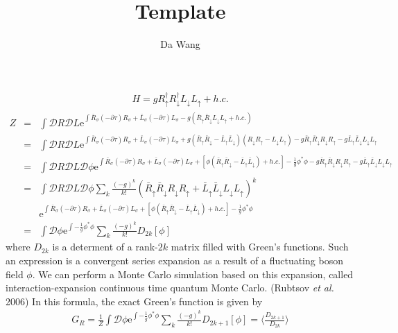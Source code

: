 \documentclass[11pt]{article}
\newcommand{\bea}{\begin{eqnarray}}
\newcommand{\eea}{\end{eqnarray}}
\newcommand{\me}{\mathrm{e}}
\begin{document}
\title{Template}
\author{Da Wang}%
\maketitle



\bea H=gR_\uparrow^\dag R_\downarrow^\dag L_\downarrow L_\uparrow + h.c. \eea 
\bea Z&=&\int{ \mathcal{D}R\mathcal{D}L \me^{\int{ \bar{R}_\sigma (-\partial\tau)R_\sigma + \bar{L}_\sigma (-\partial\tau)L_\sigma -g(\bar{R}_\uparrow \bar{R}_\downarrow L_\downarrow L_\uparrow + h.c.)} }} \\
      &=&\int{ \mathcal{D}R\mathcal{D}L \me^{\int {\bar{R}_\sigma (-\partial\tau)R_\sigma + \bar{L}_\sigma (-\partial\tau)L_\sigma +g(\bar{R}_\uparrow \bar{R}_\downarrow-\bar{L}_\uparrow \bar{L}_\downarrow)(R_\downarrow R_\uparrow-L_\downarrow L_\uparrow) - g\bar{R}_\uparrow \bar{R}_\downarrow R_\downarrow R_\uparrow -g \bar{L}_\uparrow \bar{L}_\downarrow L_\downarrow L_\uparrow}}}  \\
      &=&\int{ \mathcal{D}R\mathcal{D}L\mathcal{D}\phi \me^{ \int{  \bar{R}_\sigma (-\partial\tau)R_\sigma + \bar{L}_\sigma (-\partial\tau)L_\sigma +[\phi (\bar{R}_\uparrow \bar{R}_\downarrow-\bar{L}_\uparrow \bar{L}_\downarrow) + h.c.]-\frac1g\phi^*\phi  - g\bar{R}_\uparrow \bar{R}_\downarrow R_\downarrow R_\uparrow -g \bar{L}_\uparrow \bar{L}_\downarrow L_\downarrow L_\uparrow }}} \\
      &=&\int \mathcal{D}R\mathcal{D}L\mathcal{D}\phi \sum_k \frac{(-g)^k}{k!}(\bar{R}_\uparrow \bar{R}_\downarrow R_\downarrow R_\uparrow +\bar{L}_\uparrow \bar{L}_\downarrow L_\downarrow L_\uparrow)^k \nonumber\\ 
      &&  \me^{ \int{  \bar{R}_\sigma (-\partial\tau)R_\sigma + \bar{L}_\sigma (-\partial\tau)L_\sigma +[\phi (\bar{R}_\uparrow \bar{R}_\downarrow-\bar{L}_\uparrow \bar{L}_\downarrow) + h.c.]-\frac1g\phi^*\phi  }} \\
      &=&\int \mathcal{D}\phi\me^{\int -\frac{1}{g}\phi^*\phi } \sum_k \frac{(-g)^k}{k!} D_{2k}[\phi] \eea
where $D_{2k}$ is a determent of a rank-$2k$ matrix filled with Green's functions. Such an expression is a convergent series expansion as a result of a fluctuating boson field $\phi$. We can perform a Monte Carlo simulation based on this expansion, called interaction-expansion continuous time quantum Monte Carlo. (Rubtsov {\it et al.} 2006) In this formula, the exact Green's function is given by 
\bea G_R=\frac{1}{Z}\int \mathcal{D}\phi\me^{\int -\frac{1}{g}\phi^*\phi } \sum_k \frac{(-g)^k}{k!} D_{2k+1}[\phi] =\langle \frac{D_{2k+1}}{D_{2k}}\rangle\eea
\end{document}
